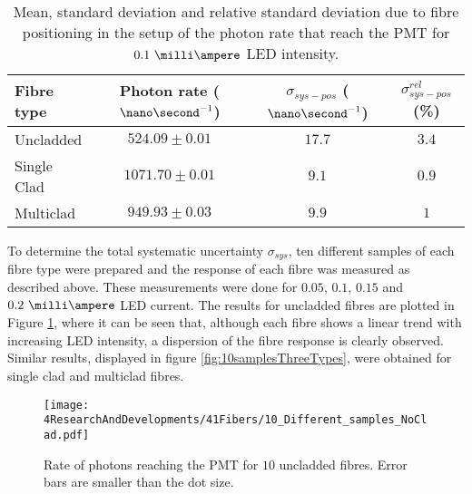 \begin{table}[htbp]
\centering{}%
\begin{tabular}{lccc}
\toprule 
Fibre type & Photon rate ($\nano\second^{-1}$) & $\sigma_{sys-pos}$ ($\nano\second^{-1}$) & $\sigma^{rel}_{sys-pos}$ (\%) \tabularnewline
\midrule
\midrule 
Uncladded & $524.09 \pm 0.01$ & $17.7$ & $3.4$ \tabularnewline
Single Clad & $1071.70 \pm 0.01$ & $9.1$ & $0.9$ \tabularnewline
Multiclad & $949.93 \pm 0.03$ & $9.9$ & $1$ \tabularnewline
\bottomrule
\end{tabular}
\caption{Mean, standard deviation and relative standard deviation due to fibre positioning in the setup of the photon rate that reach the PMT for $0.1~\milli\ampere$ LED intensity.}
\label{tab:PositionStandardDeviation}
\end{table}



To determine the total systematic uncertainty $\sigma_{sys}$, ten different samples of each fibre type were prepared and the response of each fibre was measured as described above. These measurements were done for $0.05$, $0.1$, $0.15$ and $0.2~\milli\ampere$ LED current. The results for uncladded fibres are plotted in Figure \ref{fig:10samplesNC}, where it can be seen that, although each fibre shows a linear trend with increasing LED intensity, a dispersion of the fibre response is clearly observed. Similar results, displayed in figure \ref{fig:10samplesThreeTypes}, were obtained for single clad and multiclad fibres.

\begin{figure}[h]
\centering
\texttt{[image: 4ResearchAndDevelopments/41Fibers/10\_Different\_samples\_NoClad.pdf]}
\caption{Rate of photons reaching the PMT for $10$ uncladded fibres. Error bars are smaller than the dot size.\label{fig:10samplesNC}}
\end{figure}

